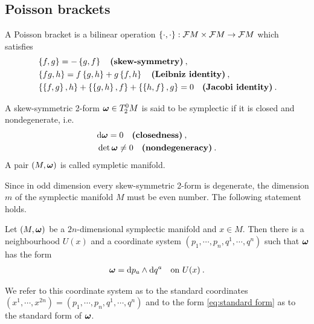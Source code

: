 \subsection{Poisson brackets}
    
\begin{definition}
    A Poisson bracket is a bilinear operation $\left \lbrace \cdot, \cdot \right \rbrace : \mathcal{F} M \times \mathcal{F} M \to \mathcal{F} M$ which satisfies
    \begin{align}
        &\left \lbrace f,g \right \rbrace = -\left \lbrace g,f \right \rbrace \quad \textbf{(skew-symmetry)} \:, \\
        &\left \lbrace fg,h \right \rbrace = f \left \lbrace g,h \right \rbrace + g \left \lbrace f,h \right \rbrace \quad \textbf{(Leibniz identity)} \:, \\
        &\left \lbrace \left \lbrace f,g \right \rbrace,h \right \rbrace + \left \lbrace \left \lbrace g,h \right \rbrace,f \right \rbrace + \left \lbrace \left \lbrace h,f \right \rbrace,g \right \rbrace = 0 \quad \textbf{(Jacobi identity)} \:.
    \end{align}
\end{definition}

\begin{definition}
    A skew-symmetric 2-form $\boldsymbol{\omega} \in T^0_2 M$ is said to be symplectic if it is closed and nondegenerate, i.e.
    \begin{align}
        &\mathrm{d} \boldsymbol{\omega} = 0 \quad \textbf{(closedness)} \:, \\
        &\det \boldsymbol{\omega} \neq 0 \quad \textbf{(nondegeneracy)}\:.
    \end{align}
    A pair $(M,\boldsymbol{\omega})$ is called sympletic manifold.
\end{definition}

Since in odd dimension every skew-symmetric 2-form is degenerate, the dimension $m$ of the symplectic manifold $M$ must be even number. The following statement holds.

\begin{theorem}
    Let $(M,\boldsymbol{\omega})$ be a $2n$-dimensional symplectic manifold and $x \in M$. Then there is a neighbourhood $U(x)$ and a coordinate system $(p_1,\cdots,p_n,q^1,\cdots,q^n)$ such that $\boldsymbol{\omega}$ has the form
    \begin{align}
        \boldsymbol{\omega} = \mathrm{d} p_a \wedge \mathrm{d} q^a \quad \text{on } U(x) \:. \label{eq:standart form}
    \end{align}
\end{theorem}
We refer to this coordinate system as to the standard coordinates \\$(x^1,\cdots, x^{2n}) = (p_1,\cdots,p_n,q^1,\cdots,q^n)$ and to the form \eqref{eq:standard form} as to the standard form of $\boldsymbol{\omega}$.

